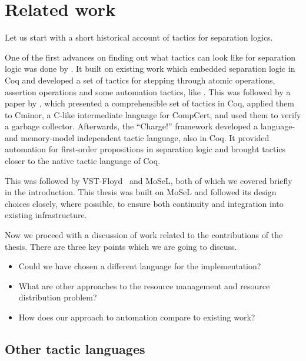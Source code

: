 \chapter{Related work}
\label{cha:related-work}

Let us start with a short historical account of tactics for separation logics.

One of the first advances on finding out what tactics can look like for separation logic was done by \citet{appel2006tactics}.
It built on existing work which embedded separation logic in Coq and developed a set of tactics for stepping through atomic operations, assertion operations and some automation tactics, like .
This was followed by a paper by \citet{mccreightPracticalTacticsSeparation2009},
which presented a comprehensible set of tactics in Coq, applied them to Cminor, a C-like intermediate language for CompCert, and used them to verify a garbage collector.
Afterwards, the ``Charge!'' framework \cite{bengtsonCharge2012} developed a language- and memory-model independent tactic language, also in Coq.
It provided automation for first-order propositions in separation logic and brought tactics closer to the native tactic language of Coq.

This was followed by VST-Floyd~\cite{caoVSTFloydSeparationLogic2018} and MoSeL\cite{krebbersInteractiveProofsHigherorder2017, krebbersMoSeLGeneralExtensible2018}, both of which we covered briefly in the introduction.
This thesis was built on MoSeL and followed its design choices closely, where possible, to ensure both continuity and integration into existing infrastructure.

Now we proceed with a discussion of work related to the contributions of the thesis.
There are three key points which we are going to discuss.
\begin{itemize}
\item Could we have chosen a different language for the implementation?
\item What are other approaches to the resource management and resource distribution problem?
\item How does our approach to automation compare to existing work?
\end{itemize}

\pagebreak

\section{Other tactic languages}
\label{sec:other-tact-lang}


